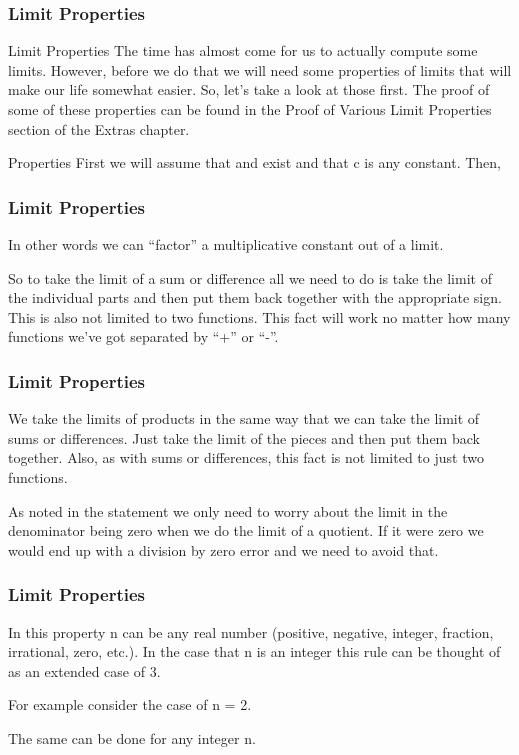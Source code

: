 \documentclass{beamer}
\begin{document}
\begin{frame}[fragile]
	\frametitle{Limit Properties}
	\Large
	Limit Properties
The time has almost come for us to actually compute some limits.  However, before we do that we will need some properties of limits that will make our life somewhat easier.  So, let’s take a look at those first.  The proof of some of these properties can be found in the Proof of Various Limit Properties section of the Extras chapter.
 
Properties
First we will assume that  and  exist and that c is any constant.  Then,
\end{frame}
\begin{frame}[fragile]
	\frametitle{Limit Properties}
	\Large
In other words we can “factor” a multiplicative constant out of a limit.
 

So to take the limit of a sum or difference all we need to do is take the limit of the individual parts and then put them back together with the appropriate sign.  This is also not limited to two functions.  This fact will work no matter how many functions we’ve got separated by “+” or “-”.
 
\end{frame}
\begin{frame}[fragile]
	\frametitle{Limit Properties}
	\Large
We take the limits of products in the same way that we can take the limit of sums or differences.  Just take the limit of the pieces and then put them back together.  Also, as with sums or differences, this fact is not limited to just two functions.
 

As noted in the statement we only need to worry about the limit in the denominator being zero when we do the limit of a quotient.  If it were zero we would end up with a division by zero error and we need to avoid that.
 
\end{frame}
\begin{frame}[fragile]
	\frametitle{Limit Properties}
	\Large
In this property n can be any real number (positive, negative, integer, fraction, irrational, zero, etc.).  In the case that n is an integer this rule can be thought of as an extended case of 3.
 
For example consider the case of n = 2.
                   
           
            The same can be done for any integer n.
 
\end{frame}
\end{document}
